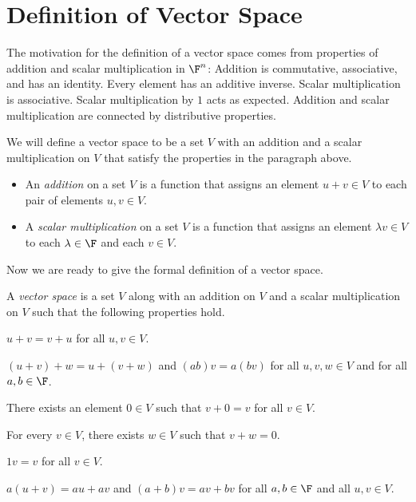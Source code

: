 \section{Definition of Vector Space}

The motivation for the definition of a vector space comes from properties of
addition and scalar multiplication in $\F^n$: Addition is commutative,
associative, and has an identity. Every element has an additive inverse. Scalar
multiplication is associative. Scalar multiplication by $1$ acts as expected.
Addition and scalar multiplication are connected by distributive properties.

We will define a vector space to be a set $V$ with an addition and a scalar
multiplication on $V$ that satisfy the properties in the paragraph above.

\begin{definition}\label{ax:1.19}\leavevmode
\begin{itemize}
\item An \emph{addition} on a set $V$ is a function that assigns an element
  $u+v\in V$ to each pair of elements $u,v\in V$.
\item A \emph{scalar multiplication} on a set $V$ is a function that assigns an
  element $\lambda v\in V$ to each $\lambda\in\F$ and each $v\in V$.
\end{itemize}
\end{definition}

Now we are ready to give the formal definition of a vector space.

\begin{definition}\label{ax:1.20}
A \emph{vector space} is a set $V$ along with an addition on $V$ and a scalar
multiplication on $V$ such that the following properties hold.
\begin{axprops}
\item[commutativity] $u+v=v+u$ for all $u,v\in V$.
\item[associativity] $(u+v)+w=u+(v+w)$ and $(ab)v=a(bv)$ for all
  $u,v,w\in V$ and for all $a,b\in\F$.
\item[additive identity] There exists an element $0\in V$ such that $v+0=v$
  for all $v\in V$.
\item[additive inverse] For every $v\in V$, there exists $w\in V$ such that
  $v+w=0$.
\item[multiplicative identity] $1v=v$ for all $v\in V$.
\item[distributive properties] $a(u+v)=au+av$ and $(a+b)v=av+bv$ for all
  $a,b\in\F$ and all $u,v\in V$.
\end{axprops}
\end{definition}

